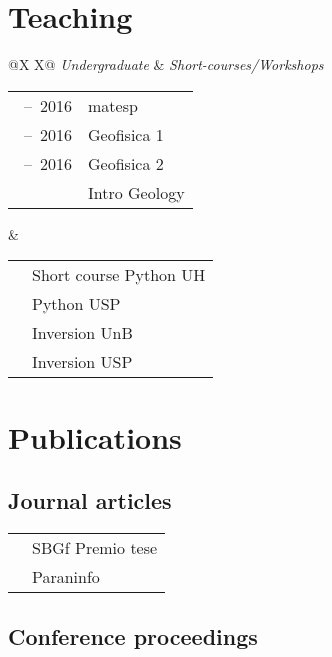 \documentclass[11pt, a4paper]{article}
\newcommand{\TablePad}{\vspace{-0.4cm}}
\newcommand{\TableTitle}[1]{{\fontsize{14pt}{0}\selectfont \itshape #1}}
\newcommand{\Duration}[2]{\fontsize{10pt}{0}\selectfont #1\ --\ #2}
\newcommand{\Year}[1]{\fontsize{10pt}{0}\selectfont #1}
\begin{document}
\section*{Teaching}

\TablePad
\begin{tabularx}{\textwidth}{@{}X X@{}}
    \TableTitle{Undergraduate} & \TableTitle{Short-courses/Workshops}
    \\[0.1cm]
    \begin{tabular}{@{}l l}
        \Duration{2014}{2016}  &
         matesp
        \hspace{10cm}
        \\
        \Duration{2014}{2016}  &
         Geofisica 1
        \\
        \Duration{2014}{2016}  &
         Geofisica 2
        \\
        \Year{2015}  &
         Intro Geology
    \end{tabular}
    &
    \begin{tabular}{@{}l l}
        \Year{2017}  &
        Short course Python UH
        \\
        \Year{2016}  &
        Python USP
        \\
        \Year{2014}  &
        Inversion UnB
        \\
        \Year{2011}  &
        Inversion USP
    \end{tabular}
\end{tabularx}


\section*{Publications}

\subsection*{Journal articles}

\TablePad
\begin{tabularx}{\textwidth}{@{}l X}
    \Year{2017}  &
    SBGf Premio tese
    \hspace{0.9\textwidth}
    \\
    \Year{2016}  &
    Paraninfo
\end{tabularx}


\subsection*{Conference proceedings}
\end{document}
